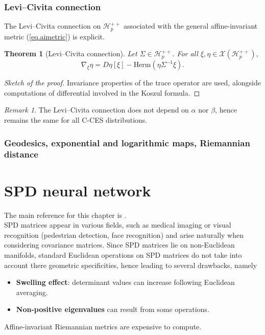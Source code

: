 \documentclass[10pt,a4paper]{book}
\theoremstyle{definition}
\theoremstyle{plain}
\newtheorem{thm}{Theorem}[section]
\theoremstyle{remark}
\newtheorem{rmk}{Remark}[section]
\begin{document}
\subsection{Levi--Civita connection}
The Levi--Civita connection on $\mathcal{H}_p^{++}$ associated with the general affine-invariant metric (\ref{eq.aimetric}) is explicit.
\begin{thm}[Levi--Civita connection] Let $\Sigma \in \mathcal{H}_p^{++}$.
For all $\xi,\eta \in \mathcal{X}(\mathcal{H}_p^{++})$,
$$\nabla_{\xi}\eta=D\eta[\xi]-\text{Herm}(\eta\Sigma^{-1}\xi).$$
\end{thm}
\begin{proof}[Sketch of the proof]
Invariance properties of the trace operator are used, alongside computations of differential involved in the Koszul formula.
\end{proof}
\begin{rmk}
The Levi--Civita connection does not depend on $\alpha$ nor $\beta$, hence remains the same for all C-CES distributions.
\end{rmk}
\subsection{Geodesics, exponential and logarithmic maps, Riemannian distance}







\chapter{SPD neural network}
The main reference for this chapter is \cite{huang2017riemannian}. \\

SPD matrices appear in various fields, such as medical imaging or visual recognition (pedestrian detection, face recognition) and arise naturally when considering covariance matrices.
Since SPD matrices lie on non-Euclidean manifolds, standard Euclidean operations on SPD matrices do not take into account there geometric specificities, hence leading to several drawbacks, namely
\begin{itemize}
    \item \textbf{Swelling effect}: determinant values can increase following Euclidean averaging.
    \item \textbf{Non-positive eigenvalues} can result from some operations.
\end{itemize}
Affine-invariant Riemannian metrics are expensive to compute.
\end{document}
